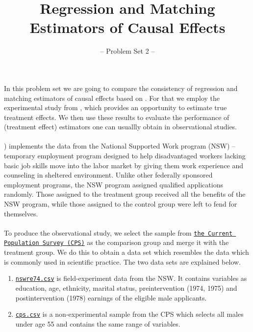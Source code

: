 

\title{Regression and Matching Estimators of Causal Effects}
\subtitle{-- Problem Set 2 --}
\date{}

\maketitle\vspace{-2cm}

In this problem set we are going to compare the consistency of regression and matching estimators of causal effects based on \cite{Dehejia.1999}. For that we employ the experimental study from \cite{LaLonde.1986}, which provides an opportunity to estimate true treatment effects. We then use these results to evaluate the performance of (treatment effect) estimators one can usuallly obtain in observational studies. \\
\\
\cite{LaLonde.1986}) implements the data from the National Supported Work program (NSW) -- temporary employment program designed to help disadvantaged workers lacking basic job skills move into the labor market by giving them work experience and counseling in sheltered environment. Unlike other federally sponsored employment programs, the NSW program assigned qualified applications randomly. Those assigned to the treatment group received all the benefits of the NSW program, while those assigned to the control group were left to fend for themselves.\\
\\
To produce the observational study, we select the sample from \href{https://www.census.gov/programs-surveys/cps.html}{\texttt{the Current Population Survey (CPS)}} as the comparison group and merge it with the treatment group.
We do this to obtain a data set which resembles the data which is commonly used in scientific practice.
The two data sets are explained below.

\begin{enumerate}
 
\item \href{https://github.com/HumanCapitalAnalysis/microeconometrics/tree/prset2/problem-sets/02-matching-estimators/data}{\texttt{nswre74.csv}} is field-experiment data from the NSW.  It contains variables as education, age, ethnicity, marital status, preintervention (1974, 1975) and postintervention (1978) earnings of the eligible male applicants.  

\item \href{https://github.com/HumanCapitalAnalysis/microeconometrics/tree/prset2/problem-sets/02-matching-estimators/data}{\texttt{cps.csv}} is a non-experimental sample from the CPS which selects all males under age 55 and contains the same range of variables.

\end {enumerate}


